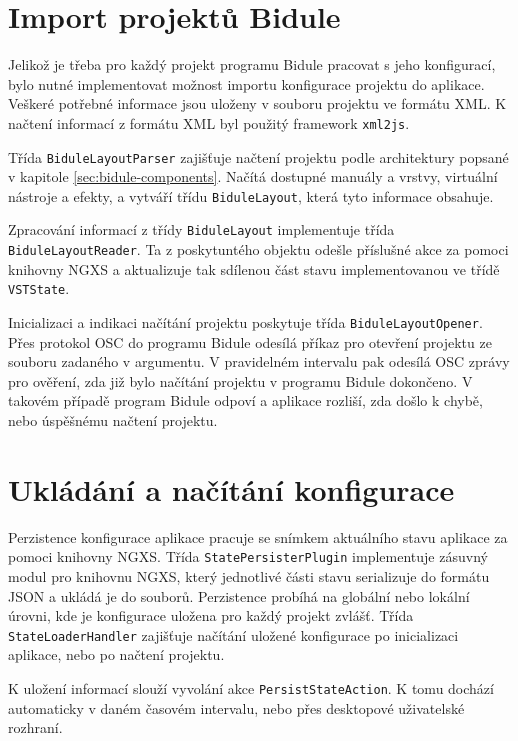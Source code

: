 \documentclass[thesis=M,czech]{FITthesis}[2019/03/06]
\begin{document}
		\section{Import projektů Bidule}
			Jelikož je třeba pro každý projekt programu Bidule pracovat s jeho konfigurací, bylo nutné implementovat možnost importu konfigurace projektu do aplikace. Veškeré potřebné informace jsou uloženy v souboru projektu ve formátu XML. K načtení
			informací z formátu XML byl použitý framework \texttt{xml2js}. 
			
			Třída \texttt{Bidule\-Layout\-Parser} zajišťuje načtení projektu podle architektury popsané v kapitole \ref{sec:bidule-components}.
			Načítá dostupné manuály a vrstvy, virtuální nástroje a efekty,
			a vytváří třídu \texttt{BiduleLayout}, která tyto informace obsahuje.
			
			Zpracování informací z třídy \texttt{BiduleLayout} implementuje třída \texttt{Bidule\-Layou\-tReader}.
			Ta z poskytuntého objektu odešle příslušné akce za pomoci knihovny NGXS a aktualizuje tak sdílenou část stavu implementovanou ve třídě \texttt{VSTState}.
			
			Inicializaci a indikaci načítání projektu poskytuje třída \texttt{Bidule\-Layout\-Opener}. Přes protokol OSC do programu Bidule odesílá příkaz pro otevření projektu ze souboru zadaného v argumentu. V pravidelném intervalu pak odesílá OSC zprávy pro ověření, zda již bylo načítání projektu v programu Bidule dokončeno. V takovém případě program Bidule odpoví a aplikace rozliší, zda došlo k chybě, nebo úspěšnému načtení projektu.			

		\section{Ukládání a načítání konfigurace}
			Perzistence konfigurace aplikace pracuje se snímkem aktuálního stavu aplikace za pomoci knihovny NGXS.
			Třída \texttt{State\-Persister\-Plugin} implementuje zásuvný modul pro knihovnu NGXS, který jednotlivé části stavu serializuje do formátu JSON a ukládá je do souborů. Perzistence probíhá na globální nebo lokální úrovni, kde je konfigurace uložena pro každý projekt zvlášť. Třída \texttt{State\-Loader\-Handler} zajišťuje načítání uložené konfigurace po inicializaci aplikace, nebo po načtení projektu.
			
			K uložení informací slouží vyvolání akce \texttt{Persist\-State\-Action}. K tomu dochází automaticky v daném časovém intervalu, nebo přes desktopové uživatelské rozhraní.
\end{document}
